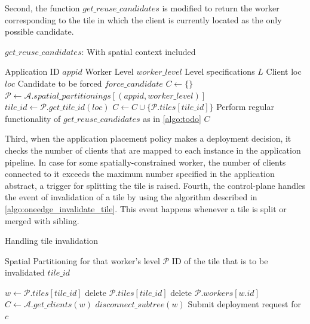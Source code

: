 Second, the function $get\_reuse\_candidates$ is modified to return the worker corresponding to the tile in which the client is currently located as the only possible candidate.

\begin{algorithm}
\caption{$get\_reuse\_candidates$: With spatial context included}
\begin{algorithmic}[1]
\Require Application ID $appid$
\Require Worker Level $worker\_level$
\Require Level specifications $L$
\Require Client loc $loc$
\Require Candidate to be forced $force\_candidate$
\State $C \gets \{\}$
    \State $\mathcal{P} \gets \mathcal{A}.spatial\_partitionings[\left( appid, worker\_level\right)]$
    \State $tile\_id \gets \mathcal{P}.get\_tile\_id \left( loc \right)$
            \State $C \gets C \cup \{ \mathcal{P}.tiles[tile\_id] \}$
        \EndIf
    \EndIf
\Else
    \State Perform regular functionality of $get\_reuse\_candidates$ as in \cref{algo:todo}
\EndIf
\State \Return $C$
\end{algorithmic}
\end{algorithm}
Third, when the application placement policy makes a deployment decision, it checks the number of clients that are mapped to each instance in the application pipeline. In case for some spatially-constrained worker, the number of clients connected to it exceeds the maximum number specified in the application abstract, a trigger for splitting the tile is raised. Fourth, the control-plane handles the event of invalidation of a tile by using the algorithm described in \cref{algo:oneedge_invalidate_tile}. This event happens whenever a tile is split or merged with sibling.

\begin{algorithm}
\caption{Handling tile invalidation}
\label{algo:oneedge_invalidate_tile}
\begin{algorithmic}[1]
\Require Spatial Partitioning for that worker's level $\mathcal{P}$
\Require ID of the tile that is to be invalidated $tile\_id$

\State $w \gets \mathcal{P}.tiles [tile\_id]$
\State delete $\mathcal{P}.tiles[tile\_id]$
\State delete $\mathcal{P}.workers[w.id]$
\State $C \gets \mathcal{A}.get\_clients \left( w \right)$ 
\State $disconnect\_subtree \left( w \right)$ 
    \State Submit deployment request for $c$
\EndFor
\end{algorithmic}
\end{algorithm}



